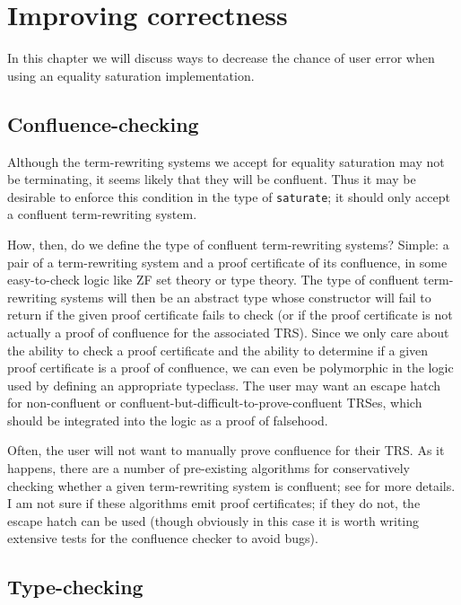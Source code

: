 \documentclass[11pt]{report}
\newcommand{\haskell}[1]{\texttt{#1}}
\begin{document}

\chapter{Improving correctness}
\label{sec:improving-correctness}

In this chapter we will discuss ways to decrease the chance of user error when
using an equality saturation implementation.

\section{Confluence-checking}
\label{sec:confluence-checking}

Although the term-rewriting systems we accept for equality saturation may not be
terminating, it seems likely that they will be confluent. Thus it may be
desirable to enforce this condition in the type of \haskell{saturate}; it should
only accept a confluent term-rewriting system.

How, then, do we define the type of confluent term-rewriting systems? Simple:
a pair of a term-rewriting system and a proof certificate of its confluence,
in some easy-to-check logic like ZF set theory or type theory. The type of
confluent term-rewriting systems will then be an abstract type whose constructor
will fail to return if the given proof certificate fails to check (or if the
proof certificate is not actually a proof of confluence for the associated TRS).
Since we only care about the ability to check a proof certificate and the
ability to determine if a given proof certificate is a proof of confluence, we
can even be polymorphic in the logic used by defining an appropriate typeclass.
The user may want an escape hatch for non-confluent or
confluent-but-difficult-to-prove-confluent TRSes, which should be integrated
into the logic as a proof of falsehood.

Often, the user will not want to manually prove confluence for their TRS.
As it happens, there are a number of pre-existing algorithms for conservatively
checking whether a given term-rewriting system is confluent; see
\cite{felgenhauer-2015} for more details. I am not sure if these algorithms
emit proof certificates; if they do not, the escape hatch can be used
(though obviously in this case it is worth writing extensive tests for the
confluence checker to avoid bugs).

\section{Type-checking}
\label{sec:type-checking}
\end{document}
